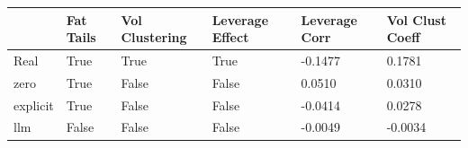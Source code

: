 \begin{tabular}{llllll}
\toprule
 & Fat Tails & Vol Clustering & Leverage Effect & Leverage Corr & Vol Clust Coeff \\
\midrule
Real & True & True & True & -0.1477 & 0.1781 \\
zero & True & False & False & 0.0510 & 0.0310 \\
explicit & True & False & False & -0.0414 & 0.0278 \\
llm & False & False & False & -0.0049 & -0.0034 \\
\bottomrule
\end{tabular}
